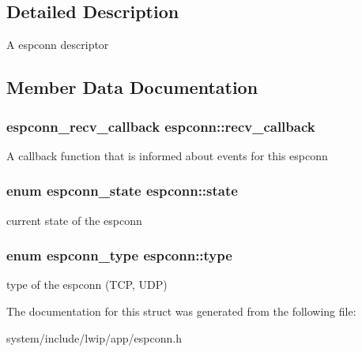 \subsection{Detailed Description}
A espconn descriptor 

\subsection{Member Data Documentation}
\hypertarget{structespconn_a89f6cc886a70f9b844093673f2083f00}{}
\subsubsection[{recv\+\_\+callback}]{\setlength{\rightskip}{0pt plus 5cm}espconn\+\_\+recv\+\_\+callback espconn\+::recv\+\_\+callback}\label{structespconn_a89f6cc886a70f9b844093673f2083f00}
A callback function that is informed about events for this espconn \hypertarget{structespconn_a613ca239a3e312e72b5a593076af30b7}{}
\subsubsection[{state}]{\setlength{\rightskip}{0pt plus 5cm}enum espconn\+\_\+state espconn\+::state}\label{structespconn_a613ca239a3e312e72b5a593076af30b7}
current state of the espconn \hypertarget{structespconn_a393c997ab67360b4e17485123518595c}{}
\subsubsection[{type}]{\setlength{\rightskip}{0pt plus 5cm}enum espconn\+\_\+type espconn\+::type}\label{structespconn_a393c997ab67360b4e17485123518595c}
type of the espconn (T\+C\+P, U\+D\+P) 

The documentation for this struct was generated from the following file\+:\begin{DoxyCompactItemize}
\item 
system/include/lwip/app/espconn.\+h\end{DoxyCompactItemize}
